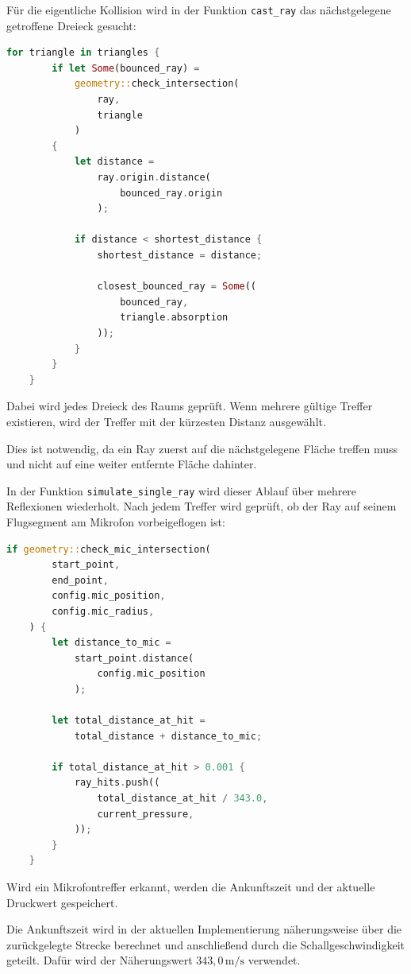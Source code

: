 \documentclass{article}
\begin{document}
    Für die eigentliche Kollision wird in der Funktion \texttt{cast\_ray} das
    nächstgelegene getroffene Dreieck gesucht:

    \begin{lstlisting}[language=Rust]
    for triangle in triangles {
        if let Some(bounced_ray) =
            geometry::check_intersection(
                ray,
                triangle
            )
        {
            let distance =
                ray.origin.distance(
                    bounced_ray.origin
                );

            if distance < shortest_distance {
                shortest_distance = distance;

                closest_bounced_ray = Some((
                    bounced_ray,
                    triangle.absorption
                ));
            }
        }
    }
    \end{lstlisting}

    Dabei wird jedes Dreieck des Raums geprüft. Wenn mehrere gültige Treffer
    existieren, wird der Treffer mit der kürzesten Distanz ausgewählt.

    Dies ist notwendig, da ein Ray zuerst auf die nächstgelegene Fläche treffen
    muss und nicht auf eine weiter entfernte Fläche dahinter.

    In der Funktion \texttt{simulate\_single\_ray} wird dieser Ablauf über
    mehrere Reflexionen wiederholt. Nach jedem Treffer wird geprüft, ob der Ray auf
    seinem Flugsegment am Mikrofon vorbeigeflogen ist:

    \begin{lstlisting}[language=Rust]
    if geometry::check_mic_intersection(
        start_point,
        end_point,
        config.mic_position,
        config.mic_radius,
    ) {
        let distance_to_mic =
            start_point.distance(
                config.mic_position
            );

        let total_distance_at_hit =
            total_distance + distance_to_mic;

        if total_distance_at_hit > 0.001 {
            ray_hits.push((
                total_distance_at_hit / 343.0,
                current_pressure,
            ));
        }
    }
    \end{lstlisting}

    Wird ein Mikrofontreffer erkannt, werden die Ankunftszeit und der aktuelle
    Druckwert gespeichert.

    Die Ankunftszeit wird in der aktuellen Implementierung näherungsweise über die
    zurückgelegte Strecke berechnet und anschließend durch die
    Schallgeschwindigkeit geteilt. Dafür wird der Näherungswert
    \(343{,}0\,\mathrm{m/s}\) verwendet.
\end{document}

